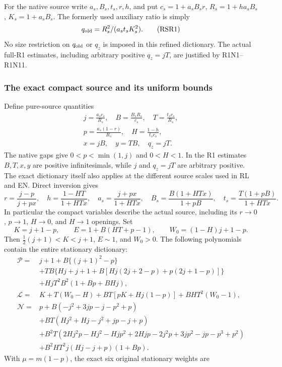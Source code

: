 For the native source write $a_s,B_s,t_s,r,h$, and put
$c_s=1+a_sB_sr$, $R_s=1+ha_sB_s$, $K_s=1+a_sB_s$.
The formerly used auxiliary ratio is simply
\[
 q_{\rm old}=R_s^2/(a_st_sK_s^2).\tag{RSR1}
\]
No size restriction on $q_{\rm old}$ or $q_z$ is imposed in this
refined dictionary. The actual full-R1 estimates, including arbitrary
positive $q_z=jT$, are justified by R1N1--R1N11.

\subsubsection*{The exact compact source and its uniform bounds}

Define pure-source quantities
\[
\begin{gathered}
 j=\frac{a_sc_s}{R_s},\quad B=\frac{B_sR_s}{c_s},\quad
 T=\frac{t_sc_s}{R_s},\\
 p=\frac{a_s(1-r)}{R_s},\quad H=\frac{1-h}{t_sc_s},\\
 x=jB,\quad y=TB,\quad q_z=jT .
\end{gathered}
 \tag{RSR2}
\]
The native gaps give $0<p<\min(1,j)$ and $0<H<1$.
In the R1 estimates $B,T,x,y$ are positive infinitesimals, while
$j$ and $q_z=jT$ are arbitrary positive. The exact dictionary itself
also applies at the different source scales used in RL and EN. Direct inversion gives
\[
 r=\frac{j-p}{j+px},\quad h=\frac{1-HT}{1+HTx},\quad
 a_s=\frac{j+px}{1+HTx},\quad
 B_s=\frac{B(1+HTx)}{1+pB},\quad
 t_s=\frac{T(1+pB)}{1+HTx}.
 \tag{RSR3}
\]
In particular the compact variables describe the actual source,
including its $r\to0$, $p\to1$, $H\to0$, and $H\to1$ openings.
Set
\[
 K=j+1-p,\qquad E=1+B(HT+p-1),\qquad
 W_0=(1-H)j+1-p.
 \tag{RSR4}
\]
Then $\tfrac12(j+1)<K<j+1$, $E\sim1$, and $W_0>0$.
The following polynomials contain the entire stationary dictionary:
\begin{align*}
\mathcal P={}&j+1+B\{(j+1)^2-p\}\\
 &+TB\{Hj+j+1+B[Hj(2j+2-p)+p(2j+1-p)]\}\\
 &+HjT^2B^2(1+Bp+BHj),\\
\mathcal L={}&K+T(W_0-H)+BT[pK+Hj(1-p)]+BHT^2(W_0-1),\\
\mathcal N={}&p+B(-j^2+3jp-j-p^2+p)\\
 &+BT(Hj^2+Hj-j^2+jp-j+p)\\
 &+B^2T(2Hj^2p-Hj^2-Hjp^2+2Hjp
             -2j^2p+3jp^2-jp-p^3+p^2)\\
 &+B^2HT^2j(Hj-j+p)(1+Bp).
 \tag{RSR5}
\end{align*}
With $\mu=m(1-p)$, the exact six original stationary weights are
